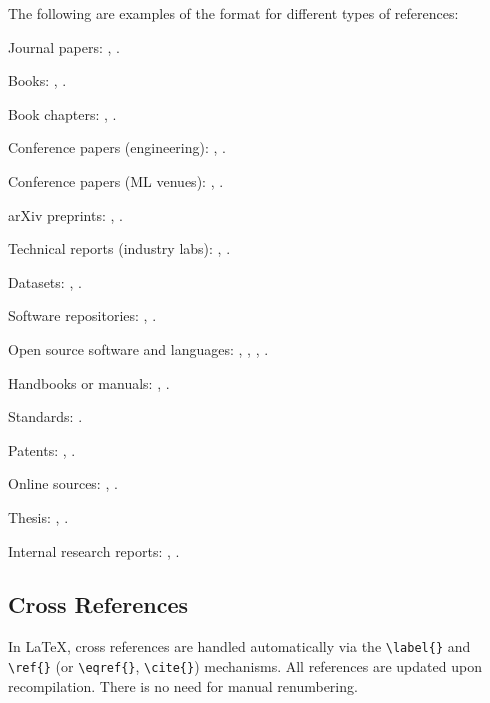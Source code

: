 \documentclass{iteso-irr}
\begin{document}
The following are examples of the format for different types of references:
%
\begin{letterlist}
  \item Journal papers: \cite{ref:rayas2006}, \cite{ref:lecun2015}.
  \item Books: \cite{ref:goodfellow2016}, \cite{ref:bishop2006}.
  \item Book chapters: \cite{ref:rayas2013ch}, \cite{ref:rayas2013ch2}.
  \item Conference papers (engineering): \cite{ref:rayas2004conf},
        \cite{ref:gutierrez2006conf}.
  \item Conference papers (ML venues): \cite{ref:he2016resnet},
        \cite{ref:devlin2019bert}.
  \item arXiv preprints: \cite{ref:vaswani2017attention},
        \cite{ref:kingma2014adam}.
  \item Technical reports (industry labs): \cite{ref:openai2023gpt4},
        \cite{ref:google2020scaling}.
  \item Datasets: \cite{ref:deng2009imagenet},
        \cite{ref:rajpurkar2016squad}.
  \item Software repositories: \cite{ref:pytorch2019},
        \cite{ref:huggingface2020transformers}.
  \item Open source software and languages: \cite{ref:python},
        \cite{ref:r_language}, \cite{ref:scikit_learn},
        \cite{ref:tensorflow2015}.
  \item Handbooks or manuals: \cite{ref:motorola}, \cite{ref:comsol}.
  \item Standards: \cite{ref:ieee_std}.
  \item Patents: \cite{ref:wilkinson_patent}, \cite{ref:corres_patent}.
  \item Online sources: \cite{ref:ieee_guide}, \cite{ref:mosis_online}.
  \item Thesis: \cite{ref:rayas_phd}, \cite{ref:gutierrez_ms}.
  \item Internal research reports: \cite{ref:rayas2015word},
        \cite{ref:perez2007}.
\end{letterlist}

\subsection{Cross References}
\label{sec:crossref}

In \LaTeX{}, cross references are handled automatically via the
\verb|\label{}| and \verb|\ref{}| (or \verb|\eqref{}|, \verb|\cite{}|)
mechanisms. All references are updated upon recompilation. There is no
need for manual renumbering.
\end{document}
